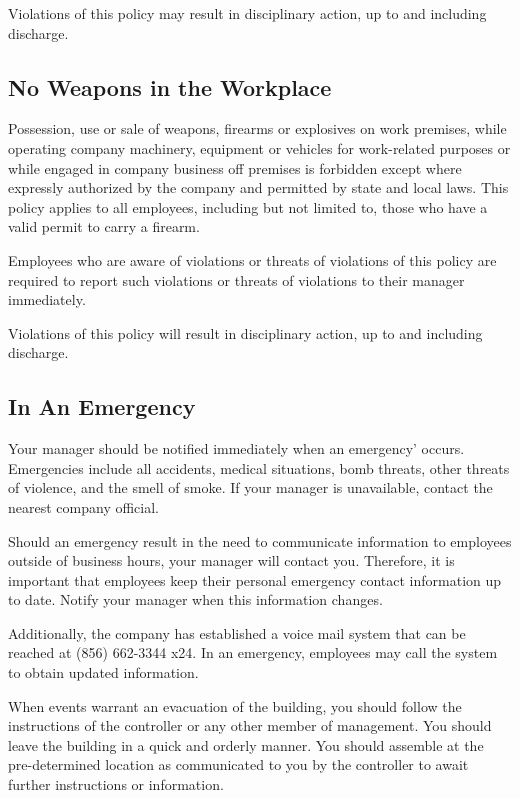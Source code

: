 \documentclass{book}
\begin{document}
Violations of this policy may result in disciplinary action, up to and including discharge.

\subsection{No Weapons in the Workplace}

Possession, use or sale of weapons, firearms or explosives on work premises, while operating company machinery, equipment or vehicles for work-related purposes or while engaged in company business off premises is forbidden except where expressly authorized by the company and permitted by state and local laws. This policy applies to all employees, including but not limited to, those who have a valid permit to carry a firearm.

Employees who are aware of violations or threats of violations of this policy are required to report such violations or threats of violations to their manager immediately.

Violations of this policy will result in disciplinary action, up to and including discharge.

\subsection{In An Emergency}

Your manager should be notified immediately when an emergency’ occurs. Emergencies include all accidents, medical situations, bomb threats, other threats of violence, and the smell of smoke. If your manager is unavailable, contact the nearest company official.

Should an emergency result in the need to communicate information to employees outside of business hours, your manager will contact you. Therefore, it is important that employees keep their personal emergency contact information up to date. Notify your manager when this information changes.

Additionally, the company has established a voice mail system that can be reached at (856) 662-3344 x24. In an emergency, employees may call the system to obtain updated information.

When events warrant an evacuation of the building, you should follow the instructions of the controller or any other member of management. You should leave the building in a quick and orderly manner. You should assemble at the pre-determined location as communicated to you by the controller to await further instructions or information.
\end{document}
